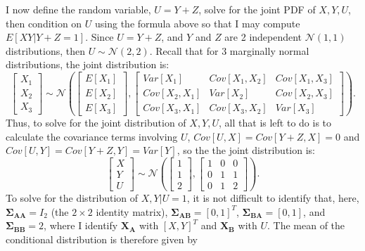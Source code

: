 \begin{problem}{3}
I now define the random variable, $U = Y+Z$, solve for the joint PDF of $X, Y, U$, then condition on $U$ using the formula above so that I may compute $E[XY|Y+Z=1]$.  Since $U = Y+Z$, and $Y$ and $Z$ are 2 independent $\mathcal N (1, 1)$ distributions, then $U\sim \mathcal N (2, 2)$.  Recall that for 3 marginally normal distributions, the joint distribution is:
\begin{equation*}
\begin{bmatrix} X_1 \\ X_2 \\ X_3 \end{bmatrix} \sim \mathcal N \left(\begin{bmatrix} E[X_1] \\ E[X_2]\\ E[X_3] \end{bmatrix},   \left[\begin{matrix}
    Var[X_1] & Cov[X_1, X_2]& Cov[X_1, X_3] \\
    Cov[X_2, X_1] & Var[X_2] & Cov[X_2, X_3] \\
    Cov[X_3, X_1] & Cov[X_3, X_2]& Var[X_3]
\end{matrix}\right] \right).
\end{equation*}
Thus, to solve for the joint distribution of $X, Y, U$, all that is left to do is to calculate the covariance terms involving $U$, $Cov[U, X] = Cov[Y+Z, X] = 0$ and $Cov[U, Y] = Cov[Y+Z, Y] = Var[Y]$, so the the joint distribution is:
\begin{equation*}
\begin{bmatrix} X \\ Y \\ U \end{bmatrix} \sim \mathcal N \left(\begin{bmatrix} 1 \\ 1 \\ 2 \end{bmatrix},   \left[\begin{matrix}
    1 & 0 & 0\\
    0 & 1& 1 \\
    0 & 1 & 2
\end{matrix}\right] \right).
\end{equation*}
To solve for the distribution of $X, Y|U=1$, it is not difficult to identify that, here, $\bm{\Sigma_{AA}} = I_2$ (the $2\times 2$ identity matrix), $\bm{\Sigma_{AB}}=[0, 1]^T$, $\bm{\Sigma_{BA}}=[0, 1]$, and $\bm{\Sigma_{BB}}=2$, where I identify $\bm{X_A}$ with $[X, Y]^T$ and $\bm{X_B}$ with $U$.  The mean of the conditional distribution is therefore given by

\end{problem}
